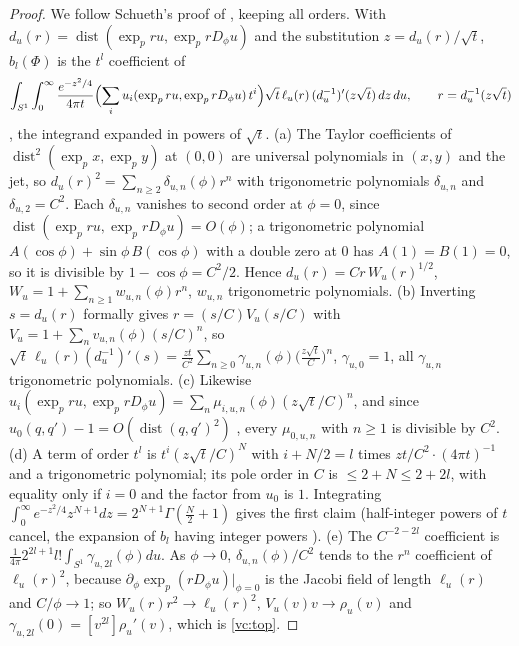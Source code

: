 \begin{proof}
We follow Schueth's proof of \cite[Thm~3.7]{schueth2019}, keeping all orders. With
$d_u(r)=\operatorname{dist}(\exp_p ru,\exp_p rD_\phi u)$ and the substitution $z=d_u(r)/\sqrt t$, $b_l(\Phi)$ is the
$t^l$ coefficient of
\[
\int_{S^1}\int_0^\infty\frac{e^{-z^2/4}}{4\pi t}\Bigl(\sum_iu_i(\exp_p ru,\exp_p rD_\phi u)\,t^i\Bigr)
\sqrt t\,\ell_u(r)\,(d_u^{-1})'(z\sqrt t)\,dz\,du,\qquad r=d_u^{-1}(z\sqrt t)
\]
\cite[(15),(16)]{schueth2019}, the integrand expanded in powers of $\sqrt t$.
(a) The Taylor coefficients of $\operatorname{dist}^2(\exp_px,\exp_py)$ at $(0,0)$ are universal polynomials
in $(x,y)$ and the jet, so $d_u(r)^2=\sum_{n\ge2}\delta_{u,n}(\phi)r^n$ with trigonometric polynomials
$\delta_{u,n}$ and $\delta_{u,2}=C^2$. Each $\delta_{u,n}$ vanishes to second order at $\phi=0$, since
$\operatorname{dist}(\exp_pru,\exp_prD_\phi u)=O(\phi)$; a trigonometric polynomial
$A(\cos\phi)+\sin\phi\,B(\cos\phi)$ with a double zero at $0$ has $A(1)=B(1)=0$, so it is divisible by
$1-\cos\phi=C^2/2$. Hence $d_u(r)=Cr\,W_u(r)^{1/2}$, $W_u=1+\sum_{n\ge1}w_{u,n}(\phi)r^n$, $w_{u,n}$
trigonometric polynomials. (b) Inverting $s=d_u(r)$ formally gives $r=(s/C)V_u(s/C)$ with
$V_u=1+\sum_nv_{u,n}(\phi)(s/C)^n$, so
$\sqrt t\,\ell_u(r)(d_u^{-1})'(s)=\frac{zt}{C^2}\sum_{n\ge0}\gamma_{u,n}(\phi)\bigl(\frac{z\sqrt t}{C}\bigr)^n$,
$\gamma_{u,0}=1$, all $\gamma_{u,n}$ trigonometric polynomials. (c) Likewise
$u_i(\exp_pru,\exp_prD_\phi u)=\sum_n\mu_{i,u,n}(\phi)(z\sqrt t/C)^n$, and since
$u_0(q,q')-1=O(\operatorname{dist}(q,q')^2)$ \cite[(6)]{schueth2019}, every $\mu_{0,u,n}$ with $n\ge1$ is divisible by
$C^2$. (d) A term of order $t^l$ is $t^i(z\sqrt t/C)^N$ with $i+N/2=l$ times $zt/C^2\cdot(4\pi t)^{-1}$ and a
trigonometric polynomial; its pole order in $C$ is $\le2+N\le2+2l$, with equality only if $i=0$ and the
factor from $u_0$ is $1$. Integrating $\int_0^\infty e^{-z^2/4}z^{N+1}dz=2^{N+1}\Gamma(\frac N2+1)$ gives the
first claim (half-integer powers of $t$ cancel, the expansion of $b_l$ having integer powers
\cite[Prop.~4.11]{dggw2008}). (e) The $C^{-2-2l}$ coefficient is
$\frac{1}{4\pi}2^{2l+1}l!\int_{S^1}\gamma_{u,2l}(\phi)du$. As $\phi\to0$, $\delta_{u,n}(\phi)/C^2$ tends to the
$r^n$ coefficient of $\ell_u(r)^2$, because $\partial_\phi\exp_p(rD_\phi u)|_{\phi=0}$ is the Jacobi field of
length $\ell_u(r)$ and $C/\phi\to1$; so $W_u(r)r^2\to\ell_u(r)^2$, $V_u(v)v\to\rho_u(v)$ and
$\gamma_{u,2l}(0)=[v^{2l}]\rho_u'(v)$, which is \eqref{vc:top}.
\end{proof}

